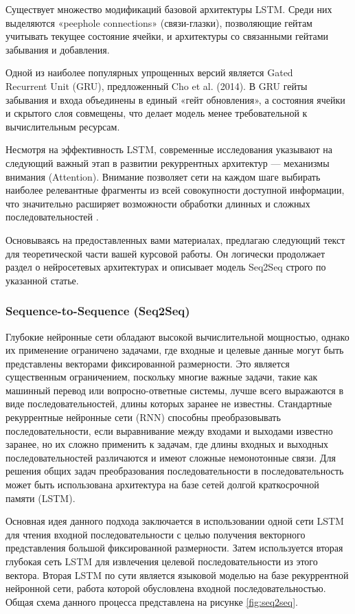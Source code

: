 \documentclass[coursework]{SCWorks}
\begin{document}
    Существует множество модификаций базовой архитектуры LSTM. Среди них выделяются «peephole connections» (связи-глазки), позволяющие гейтам учитывать текущее состояние ячейки, и архитектуры со связанными гейтами забывания и добавления.

    Одной из наиболее популярных упрощенных версий является Gated \\ Recurrent Unit (GRU), предложенный Cho et al. (2014).
    В GRU гейты забывания и входа объединены в единый «гейт обновления», а состояния ячейки и скрытого слоя совмещены, что делает модель менее требовательной к вычислительным ресурсам.

    Несмотря на эффективность LSTM, современные исследования указывают на следующий важный этап в развитии рекуррентных архитектур — механизмы внимания (Attention).
    Внимание позволяет сети на каждом шаге выбирать наиболее релевантные фрагменты из всей совокупности доступной информации, что значительно расширяет возможности обработки длинных и сложных последовательностей \cite{olah2015lstm}.

    Основываясь на предоставленных вами материалах, предлагаю следующий текст для теоретической части вашей курсовой работы. Он логически продолжает раздел о нейросетевых архитектурах и описывает модель Seq2Seq строго по указанной статье.

    \subsubsection{Sequence-to-Sequence (Seq2Seq)}

    Глубокие нейронные сети обладают высокой вычислительной мощностью,
    однако их применение ограничено задачами, где входные и целевые данные могут быть представлены
    векторами фиксированной размерности.
    Это является существенным ограничением, поскольку многие важные задачи,
    такие как машинный перевод или вопросно-ответные системы, лучше всего выражаются в виде последовательностей,
    длины которых заранее не известны.
    Стандартные рекуррентные нейронные сети (RNN) способны преобразовывать последовательности,
    если выравнивание между входами и выходами известно заранее, но их сложно применить к задачам,
    где длины входных и выходных последовательностей различаются и имеют сложные немонотонные связи.
    Для решения общих задач преобразования последовательности в последовательность может быть использована
    архитектура на базе сетей долгой краткосрочной памяти (LSTM).

    Основная идея данного подхода заключается в использовании одной сети LSTM для чтения входной
    последовательности с целью получения векторного представления большой фиксированной размерности.
    Затем используется вторая глубокая сеть LSTM для извлечения целевой последовательности из этого вектора.
    Вторая LSTM по сути является языковой моделью на базе рекуррентной нейронной сети,
    работа которой обусловлена входной последовательностью.
    Общая схема данного процесса представлена на рисунке \ref{fig:seq2seq}.
\end{document}
